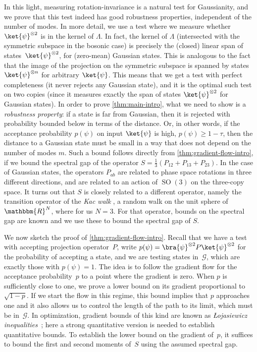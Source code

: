 \documentclass[11pt,a4paper]{article}
\numberwithin{equation}{section}
\newcommand{\ot}{\otimes}
\newcommand{\RR}{\mathbbm{R}}
\newcommand{\GG}{\mathcal G}
\newcommand{\1}{\mathbf{1}}
\DeclareMathOperator{\SO}{SO}
\begin{document}
In this light, measuring rotation-invariance is a natural test for Gaussianity, and we prove that this test indeed has good robustness properties, independent of the number of modes.
In more detail, we use a test where we measure whether $\ket{\psi}^{\ot 2}$ is in the kernel of $\Lambda$.
In fact, the kernel of $\Lambda$ (intersected with the symmetric subspace in the bosonic case) is precisely the (closed) linear span of states~$\ket{\psi}^{\ot 2}$, for (zero-mean) Gaussian states.
This is analogous to the fact that the image of the projection on the symmetric subspace is spanned by states $\ket{\psi}^{\ot n}$ for arbitrary $\ket{\psi}$.
This means that we get a test with perfect completeness (it never rejects any Gaussian state), and it is the optimal such test on two copies (since it measures exactly the span of states $\ket{\psi}^{\ot 2}$ for Gaussian states).
In order to prove \cref{thm:main-intro}, what we need to show is a \emph{robustness property}: if a state is far from Gaussian, then it is rejected with probability bounded below in terms of the distance.
Or, in other words, if the acceptance probability $p(\psi)$ on input $\ket{\psi}$ is high, $p(\psi) \geq 1 - \tau$, then the distance to a Gaussian state must be small in a way that does not depend on the number of modes $m$.
Such a bound follows directly from \cref{thm:gradient-flow-intro}, if we bound the spectral gap of the operator $S = \frac13\left(P_{12} + P_{13} + P_{23}\right)$.
In the case of Gaussian states, the operators $P_{ab}$ are related to phase space rotations in three different directions, and are related to an action of $\SO(3)$ on the three-copy space.
It turns out that $S$ is closely related to a different operator, namely the transition operator of the \emph{Kac walk} \cite{kac1956foundations}, a random walk on the unit sphere of~$\RR^N$, where for us $N=3$.
For that operator, bounds on the spectral gap are known \cite{carlen2000many,diaconis2000bounds,maslen2003eigenvalues,carlen2003determination,caputo2008spectral} and we use these to bound the spectral gap of $S$.

We now sketch the proof of \cref{thm:gradient-flow-intro}.
Recall that we have a test with accepting projection operator~$P$, write $p(\psi) = \bra{\psi}^{\ot 2} P \ket{\psi}^{\ot 2}$ for the probability of accepting a state, and we are testing states in~$\GG$, which are exactly those with $p(\psi) = 1$.
The idea is to follow the gradient flow for the acceptance probability~$p$ to a point where the gradient is zero.
When $p$ is sufficiently close to one, we prove a lower bound on its gradient proportional to $\sqrt{1-p}$.
If we start the flow in this regime, this bound implies that $p$ approaches one and it also allows us to control the length of the path to its limit, which must be in~$\GG$.
In optimization, gradient bounds of this kind are known as \emph{\L{}ojasiewicz inequalities}~\cite{lojasiewicz1965ensembles};
here a strong quantitative version is needed to establish quantitative bounds.
To establish the lower bound on the gradient of~$p$, it suffices to bound the first and second moments of~$S$ using the assumed spectral gap.
\end{document}
